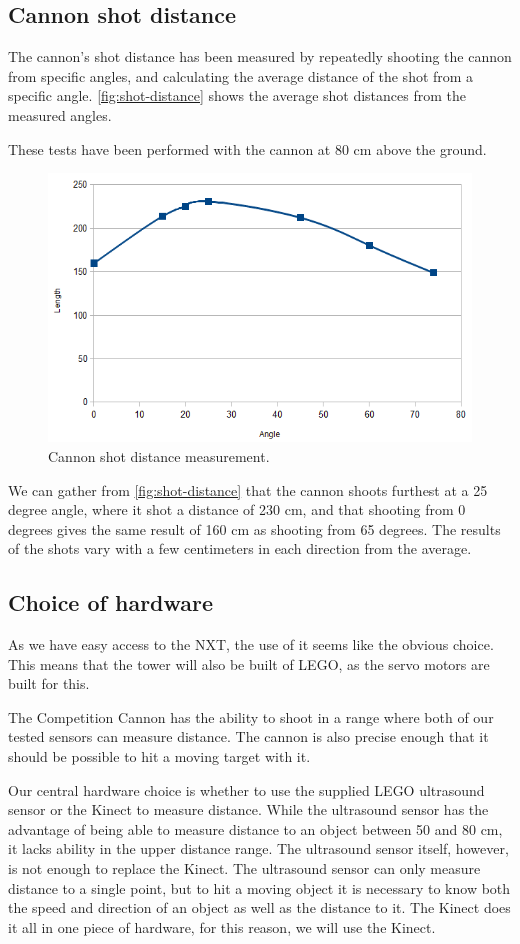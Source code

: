 \subsection{Cannon shot distance}
The cannon's shot distance has been measured by repeatedly shooting the cannon from specific angles, and calculating the average distance of the shot from a specific angle. \autoref{fig:shot-distance} shows the average shot distances from the measured angles.

These tests have been performed with the cannon at 80 cm above the ground.

\begin{figure}[hbtp]
\includegraphics[width=\textwidth]{img/cannon-shot-distance.png}
\caption{Cannon shot distance measurement.} 
\label{fig:shot-distance} 
\end{figure}

We can gather from \autoref{fig:shot-distance} that the cannon shoots furthest at a 25 degree angle, where it shot a distance of 230 cm, and that shooting from 0 degrees gives the same result of 160 cm as shooting from 65 degrees. The results of the shots vary with a few centimeters in each direction from the average.

\subsection{Choice of hardware}
As we have easy access to the NXT, the use of it seems like the obvious choice. This means that the tower will also be built of LEGO, as the servo motors are built for this.

The Competition Cannon has the ability to shoot in a range where both of our tested sensors can measure distance. The cannon is also precise enough that it should be possible to hit a moving target with it.

Our central hardware choice is whether to use the supplied LEGO ultrasound sensor or the Kinect to measure distance. While the ultrasound sensor has the advantage of being able to measure distance to an object between 50 and 80 cm, it lacks ability in the upper distance range. The ultrasound sensor itself, however, is not enough to replace the Kinect. The ultrasound sensor can only measure distance to a single point, but to hit a moving object it is necessary to know both the speed and direction of an object as well as the distance to it. The Kinect does it all in one piece of hardware, for this reason, we will use the Kinect.
